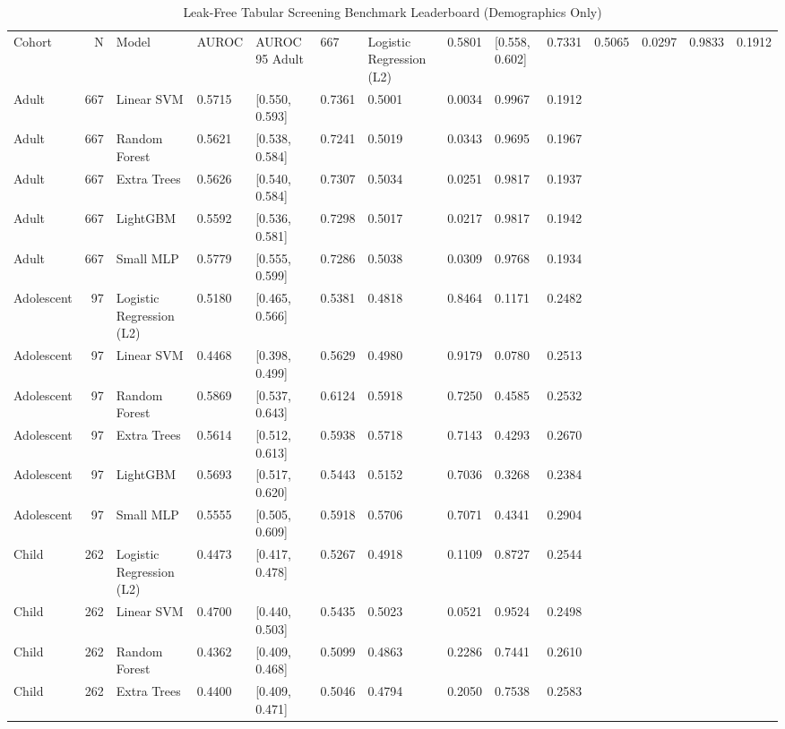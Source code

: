 \begin{table}
\caption{Leak-Free Tabular Screening Benchmark Leaderboard (Demographics Only)}
\label{tab:tabular_leaderboard}
\begin{tabular}{lrllllllll}
\toprule
Cohort & N & Model & AUROC & AUROC 95%
\midrule
Adult & 667 & Logistic Regression (L2) & 0.5801 & [0.558, 0.602] & 0.7331 & 0.5065 & 0.0297 & 0.9833 & 0.1912 \\
Adult & 667 & Linear SVM & 0.5715 & [0.550, 0.593] & 0.7361 & 0.5001 & 0.0034 & 0.9967 & 0.1912 \\
Adult & 667 & Random Forest & 0.5621 & [0.538, 0.584] & 0.7241 & 0.5019 & 0.0343 & 0.9695 & 0.1967 \\
Adult & 667 & Extra Trees & 0.5626 & [0.540, 0.584] & 0.7307 & 0.5034 & 0.0251 & 0.9817 & 0.1937 \\
Adult & 667 & LightGBM & 0.5592 & [0.536, 0.581] & 0.7298 & 0.5017 & 0.0217 & 0.9817 & 0.1942 \\
Adult & 667 & Small MLP & 0.5779 & [0.555, 0.599] & 0.7286 & 0.5038 & 0.0309 & 0.9768 & 0.1934 \\
Adolescent & 97 & Logistic Regression (L2) & 0.5180 & [0.465, 0.566] & 0.5381 & 0.4818 & 0.8464 & 0.1171 & 0.2482 \\
Adolescent & 97 & Linear SVM & 0.4468 & [0.398, 0.499] & 0.5629 & 0.4980 & 0.9179 & 0.0780 & 0.2513 \\
Adolescent & 97 & Random Forest & 0.5869 & [0.537, 0.643] & 0.6124 & 0.5918 & 0.7250 & 0.4585 & 0.2532 \\
Adolescent & 97 & Extra Trees & 0.5614 & [0.512, 0.613] & 0.5938 & 0.5718 & 0.7143 & 0.4293 & 0.2670 \\
Adolescent & 97 & LightGBM & 0.5693 & [0.517, 0.620] & 0.5443 & 0.5152 & 0.7036 & 0.3268 & 0.2384 \\
Adolescent & 97 & Small MLP & 0.5555 & [0.505, 0.609] & 0.5918 & 0.5706 & 0.7071 & 0.4341 & 0.2904 \\
Child & 262 & Logistic Regression (L2) & 0.4473 & [0.417, 0.478] & 0.5267 & 0.4918 & 0.1109 & 0.8727 & 0.2544 \\
Child & 262 & Linear SVM & 0.4700 & [0.440, 0.503] & 0.5435 & 0.5023 & 0.0521 & 0.9524 & 0.2498 \\
Child & 262 & Random Forest & 0.4362 & [0.409, 0.468] & 0.5099 & 0.4863 & 0.2286 & 0.7441 & 0.2610 \\
Child & 262 & Extra Trees & 0.4400 & [0.409, 0.471] & 0.5046 & 0.4794 & 0.2050 & 0.7538 & 0.2583 \\

\end{tabular}
\end{table}
